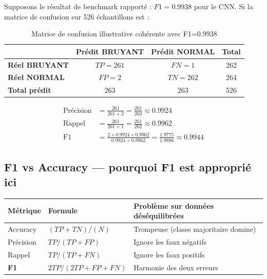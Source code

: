 \documentclass[11pt,a4paper]{article}
\begin{document}
Supposons le résultat de benchmark rapporté : $F1 = 0.9938$ pour le CNN.
Si la matrice de confusion sur 526 échantillons est :

\begin{table}[h!]
\centering
\renewcommand{\arraystretch}{1.4}
\begin{tabular}{l|cc|c}
\toprule
 & \textbf{Prédit BRUYANT} & \textbf{Prédit NORMAL} & \textbf{Total} \\
\midrule
\textbf{Réel BRUYANT} & $TP = 261$  & $FN = 1$  & 262 \\
\textbf{Réel NORMAL}  & $FP = 2$    & $TN = 262$ & 264 \\
\midrule
\textbf{Total prédit} & 263 & 263 & 526 \\
\bottomrule
\end{tabular}
\caption{Matrice de confusion illustrative cohérente avec F1=0.9938}
\end{table}

\begin{align*}
\text{Précision} &= \frac{261}{261+2} = \frac{261}{263} \approx 0.9924 \\[4pt]
\text{Rappel}    &= \frac{261}{261+1} = \frac{261}{262} \approx 0.9962 \\[4pt]
\text{F1}        &= \frac{2 \times 0.9924 \times 0.9962}{0.9924+0.9962}
                  = \frac{1.9775}{1.9886} \approx 0.9944
\end{align*}

\subsection{F1 vs Accuracy — pourquoi F1 est approprié ici}

\begin{table}[h!]
\centering
\renewcommand{\arraystretch}{1.3}
\begin{tabular}{lll}
\toprule
\textbf{Métrique} & \textbf{Formule} & \textbf{Problème sur données déséquilibrées} \\
\midrule
Accuracy & $(TP+TN)/(N)$      & Trompeuse (classe majoritaire domine) \\
Précision & $TP/(TP+FP)$       & Ignore les faux négatifs \\
Rappel    & $TP/(TP+FN)$       & Ignore les faux positifs \\
\textbf{F1} & $2TP/(2TP+FP+FN)$ & Harmonie des deux erreurs \\
\bottomrule
\end{tabular}
\end{table}
\end{document}
